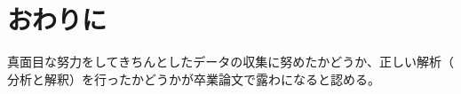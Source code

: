 \documentclass[twoside,uplatex]{ujarticle}
\begin{document}
\section{おわりに}
真面目な努力をしてきちんとしたデータの収集に努めたかどうか、正しい解析（
分析と解釈）を行ったかどうかが卒業論文で露わになると認める。


\end{document}
